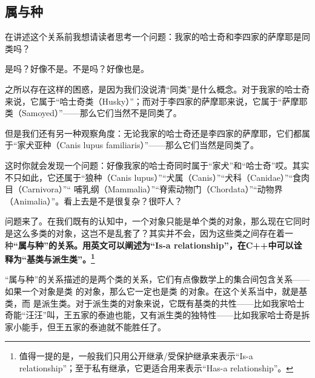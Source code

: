 \subsection*{属与种}
在讲述这个关系前我想请读者思考一个问题：我家的哈士奇和李四家的萨摩耶是同类吗？\par
是吗？好像不是。不是吗？好像也是。\par
之所以存在这样的困惑，是因为我们没说清``同类''是什么概念。对于我家的哈士奇来说，它属于``哈士奇类（Husky）''；而对于李四家的萨摩耶来说，它属于``萨摩耶类（Samoyed）''——那么它们当然不是同类了。\par
但是我们还有另一种观察角度：无论我家的哈士奇还是李四家的萨摩耶，它们都属于``家犬亚种（Canis lupus familiaris）''——那么它们当然是同类了。\par
这时你就会发现一个问题：好像我家的哈士奇同时属于``家犬''和``哈士奇''哎。其实不只如此，它还属于``狼种（Canis lupus）''``犬属（Canis）''``犬科（Canidae）''``食肉目（Carnivora）''``	哺乳纲（Mammalia）''``脊索动物门（Chordata）''``动物界（Animalia）''。看上去是不是很复杂？很吓人？\par
问题来了。在我们既有的认知中，一个对象只能是单个类的对象，那么现在它同时是这么多类的对象，这岂不是乱套了？其实并不会，因为这些类之间存在着一种\textbf{``属与种''的关系。用英文可以阐述为``Is-a relationship''，在C++中可以诠释为``基类与派生类''。\footnote{值得一提的是，一般我们只用公开继承/受保护继承来表示``Is-a relationship''；至于私有继承，它更适合用来表示``Has-a relationship''。}}\par
``属与种''的关系描述的是两个类的关系，它们有点像数学上的集合间包含关系——如果一个对象是类 \lstinline@A@ 的对象，那么它一定也是类 \lstinline@B@ 的对象。在这个关系当中，\lstinline@A@ 就是基类，而 \lstinline@B@ 是派生类。对于派生类的对象来说，它既有基类的共性——比如我家哈士奇能``汪汪''叫，王五家的泰迪也能，又有派生类的独特性——比如我家哈士奇是拆家小能手，但王五家的泰迪就不能胜任了。\par
